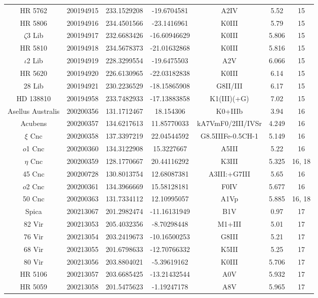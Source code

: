 \begin{table*}
\begin{tabular}{ccccccc}
HR 5762 & 200194915 & 233.1529208 & -19.6704581 & A2IV & 5.52 & 15 \\
HR 5806 & 200194916 & 234.4501566 & -23.1416961 & K0III & 5.79 & 15 \\
$\zeta$3 Lib & 200194917 & 232.6683426 & -16.60946629 & K0III & 5.806 & 15 \\
HR 5810 & 200194918 & 234.5678373 & -21.01632868 & K0III & 5.816 & 15 \\
$\iota$2 Lib & 200194919 & 228.3299554 & -19.6475503 & A2V & 6.066 & 15 \\
HR 5620 & 200194920 & 226.6130965 & -22.03182838 & K0III & 6.14 & 15 \\
28 Lib & 200194921 & 230.2236529 & -18.15865908 & G8II/III & 6.17 & 15 \\
HD 138810 & 200194958 & 233.7482933 & -17.13883858 & K1(III)(+G) & 7.02 & 15 \\
Asellus Australis & 200200356 & 131.1712467 & 18.154306 & K0+IIIb & 3.94 & 16 \\
Acubens & 200200357 & 134.6217613 & 11.85770033 & kA7VmF0/2III/IVSr & 4.249 & 16 \\
$\xi$ Cnc & 200200358 & 137.3397219 & 22.04544592 & G8.5IIIFe-0.5CH-1 & 5.149 & 16 \\
$o$1 Cnc & 200200360 & 134.3122908 & 15.3227667 & A5III & 5.22 & 16 \\
$\eta$ Cnc & 200200359 & 128.1770667 & 20.44116292 & K3III & 5.325 & 16, 18 \\
45 Cnc & 200200728 & 130.8013754 & 12.68087381 & A3III:+G7III & 5.65 & 16 \\
$o$2 Cnc & 200200361 & 134.3966669 & 15.58128181 & F0IV & 5.677 & 16 \\
50 Cnc & 200200363 & 131.7334112 & 12.10995057 & A1Vp & 5.885 & 16, 18 \\
Spica & 200213067 & 201.2982474 & -11.16131949 & B1V & 0.97 & 17 \\
82 Vir & 200213053 & 205.4032356 & -8.70298448 & M1+III & 5.01 & 17 \\
76 Vir & 200213054 & 203.2419673 & -10.16500253 & G8III & 5.21 & 17 \\
68 Vir & 200213055 & 201.6798633 & -12.70766332 & K5III & 5.25 & 17 \\
80 Vir & 200213056 & 203.8804021 & -5.39619162 & K0III & 5.706 & 17 \\
HR 5106 & 200213057 & 203.6685425 & -13.21432544 & A0V & 5.932 & 17 \\
HR 5059 & 200213058 & 201.5475623 & -1.19247178 & A8V & 5.965 & 17 \\

\end{tabular}
\end{table*}
